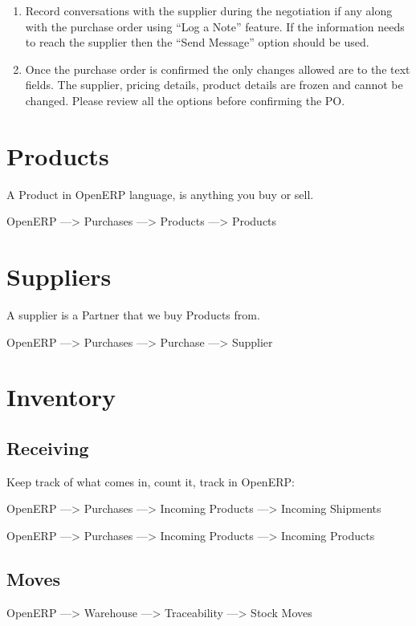 \begin{enumerate}
\item Record conversations with the supplier during the negotiation if any along with the purchase order using “Log a Note” feature. If the information needs to reach the supplier then the “Send Message” option should be used.
\item Once the purchase order is confirmed the only changes allowed are to the text fields. The supplier, pricing details, product details are frozen and cannot be changed. Please review all the options before confirming the PO.
\end{enumerate}

\section{Products}
A Product in OpenERP language, is anything you buy or sell.

OpenERP ---> Purchases ---> Products ---> Products

\section{Suppliers}
A supplier is a Partner that we buy Products from.

OpenERP ---> Purchases ---> Purchase ---> Supplier

\section{Inventory}

\subsection{Receiving}
Keep track of what comes in, count it, track in OpenERP:

OpenERP ---> Purchases ---> Incoming Products ---> Incoming Shipments

OpenERP ---> Purchases ---> Incoming Products ---> Incoming Products

\subsection{Moves}

OpenERP ---> Warehouse ---> Traceability ---> Stock Moves


